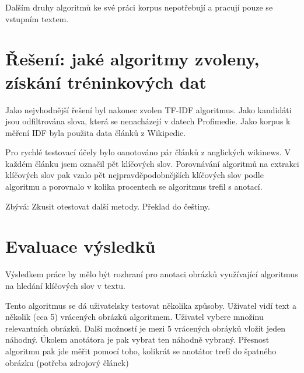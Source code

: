 Dalším druhy algoritmů ke své práci korpus nepotřebují a pracují pouze se vstupním textem.

\section{Řešení: jaké algoritmy zvoleny, získání tréninkových dat}

Jako nejvhodnější řešení byl nakonec zvolen TF-IDF algoritmus. Jako kandidáti jsou odfiltrována slova, která se nenacházejí v datech Profimedie. Jako korpus k měření IDF byla použita data článků z Wikipedie.

Pro rychlé testovací účely bylo oanotováno pár článků z anglických wikinews. V každém článku jsem označil pět klíčových slov. Porovnávání algoritmů na extrakci klíčových slov pak vzalo pět nejpravděpodobnějších klíčových slov podle algoritmu a porovnalo v kolika procentech se algoritmus trefil s anotací.

Zbývá: Zkusit otestovat další metody. Překlad do češtiny.

\section{Evaluace výsledků}

Výsledkem práce by mělo být rozhraní pro anotaci obrázků využívající algoritmus na hledání klíčových slov v textu.

Tento algoritmus se dá uživatelsky testovat několika způsoby. Uživatel vidí text a několik (cca 5) vrácených obrázků algoritmem. Uživatel vybere množinu relevantních obrázků. Další možností je mezi 5 vrácených obráyků vložit jeden náhodný. Úkolem anotátora je pak vybrat ten náhodně vybraný. Přesnost algoritmu pak jde měřit pomocí toho, kolikrát se anotátor trefí do špatného obrázku (potřeba zdrojový článek)




